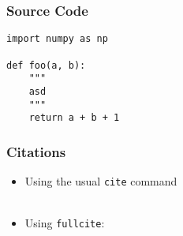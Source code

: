 \documentclass[aspectratio=1610]{beamer}
\begin{document}
\begin{frame}[fragile]
    \frametitle{Source Code}

\begin{verbatim}
import numpy as np

def foo(a, b):
    """
    asd
    """
    return a + b + 1
\end{verbatim}

\end{frame}

\begin{frame}
    \frametitle{Citations}
    
    \begin{itemize}
        \item Using the usual \texttt{cite} command \cite{debus2023reporting}\\~
        
        \item Using \texttt{fullcite}:
    \end{itemize}
    
    \vspace{1em}
\end{frame}


\newcommand\crule[3][black]{\textcolor{#1}{\rule{#2}{#3}}}
\end{document}
